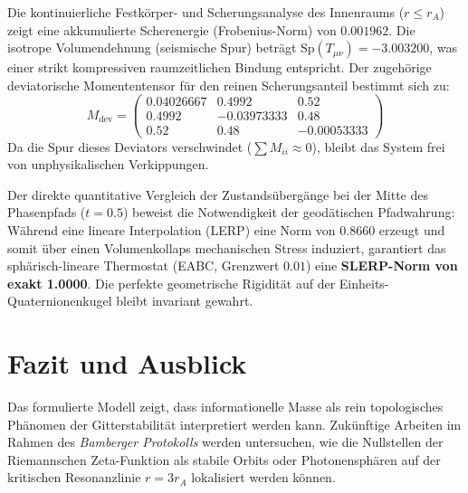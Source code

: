 \documentclass[11pt,a4paper,nofootinbib]{article}
\begin{document}
	Die kontinuierliche Festkörper- und Scherungsanalyse des Innenraums ($r \le r_A$) zeigt eine akkumulierte Scherenergie (Frobenius-Norm) von $0.001962$. Die isotrope Volumendehnung (seismische Spur) beträgt $\text{Sp}(T_{\mu\nu}) = -3.003200$, was einer strikt kompressiven raumzeitlichen Bindung entspricht. Der zugehörige deviatorische Momententensor für den reinen Scherungsanteil bestimmt sich zu:
	\begin{equation}
		M_{\text{dev}} = \begin{pmatrix} 
			0.04026667 & 0.4992 & 0.52 \\ 
			0.4992 & -0.03973333 & 0.48 \\ 
			0.52 & 0.48 & -0.00053333 
		\end{pmatrix}
	\end{equation}
	Da die Spur dieses Deviators verschwindet ($\sum M_{ii} \approx 0$), bleibt das System frei von unphysikalischen Verkippungen. 
	
	Der direkte quantitative Vergleich der Zustandsübergänge bei der Mitte des Phasenpfads ($t = 0.5$) beweist die Notwendigkeit der geodätischen Pfadwahrung: Während eine lineare Interpolation (LERP) eine Norm von $0.8660$ erzeugt und somit über einen Volumenkollaps mechanischen Stress induziert, garantiert das sphärisch-lineare Thermostat (EABC, Grenzwert $0.01$) eine \textbf{SLERP-Norm von exakt 1.0000}. Die perfekte geometrische Rigidität auf der Einheits-Quaternionenkugel bleibt invariant gewahrt.
	
	\section{Fazit und Ausblick}
	Das formulierte Modell zeigt, dass informationelle Masse als rein topologisches Phänomen der Gitterstabilität interpretiert werden kann. Zukünftige Arbeiten im Rahmen des \textit{Bamberger Protokolls} werden untersuchen, wie die Nullstellen der Riemannschen Zeta-Funktion als stabile Orbits oder Photonensphären auf der kritischen Resonanzlinie $r = 3 r_A$ lokalisiert werden können.
	
\end{document}
